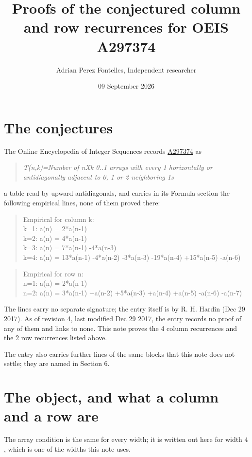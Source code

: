 \documentclass[11pt]{article}
\title{Proofs of the conjectured column and row recurrences for OEIS A297374}
\author{Adrian Perez Fontelles, Independent researcher}
\date{09 September 2026}
\theoremstyle{definition}
\begin{document}
\maketitle
\section{The conjectures}

The Online Encyclopedia of Integer Sequences records \href{https://oeis.org/A297374}{A297374} as

\begin{quote}\itshape T(n,k)=Number of nXk 0..1 arrays with every 1 horizontally or antidiagonally adjacent to 0, 1 or 2 neighboring 1s\end{quote}

a table read by upward antidiagonals, and carries in its Formula section the following empirical lines, none of them proved there:

\begin{quote}\ttfamily Empirical for column k:\\
k=1: a(n) = 2*a(n-1)\\k=2: a(n) = 4*a(n-1)\\k=3: a(n) = 7*a(n-1) -4*a(n-3)\\k=4: a(n) = 13*a(n-1) -4*a(n-2) -3*a(n-3) -19*a(n-4) +15*a(n-5) -a(n-6)\end{quote}

\begin{quote}\ttfamily Empirical for row n:\\
n=1: a(n) = 2*a(n-1)\\n=2: a(n) = 3*a(n-1) +a(n-2) +5*a(n-3) +a(n-4) +a(n-5) -a(n-6) -a(n-7)\end{quote}

The lines carry no separate signature; the entry itself is by R. H. Hardin (Dec 29 2017). As of revision 4, last modified Dec 29 2017, the entry records no proof of any of them and links to none. This note proves the 4 column recurrences and the 2 row recurrences listed above.

The entry also carries further lines of the same blocks that this note does not settle; they are named in Section 6.

\section{The object, and what a column and a row are}

The array condition is the same for every width; it is written out here for width $4$, which is one of the widths this note uses.
\end{document}
